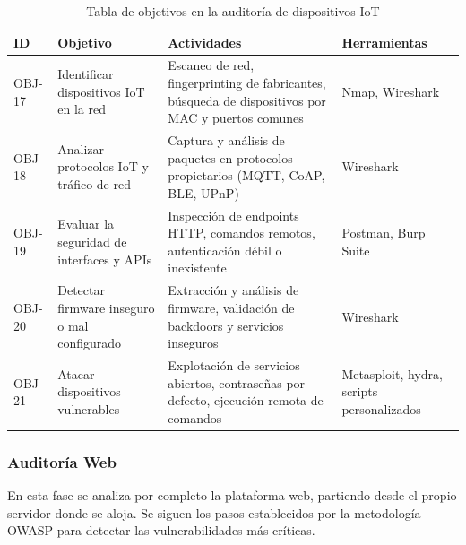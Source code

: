 \documentclass[a4paper, 11pt]{article}
\begin{document}
\begin{table}[H]
\centering
\renewcommand{\arraystretch}{1.4}
    \begin{tabular}{|p{1.4cm}|p{3.9cm}|p{5.3cm}|p{4.2cm}|}
\hline
\textbf{ID} & \textbf{Objetivo} & \textbf{Actividades} & \textbf{Herramientas}  \\
\hline
OBJ-17 & Identificar dispositivos IoT en la red & Escaneo de red, fingerprinting de fabricantes, búsqueda de dispositivos por MAC y puertos comunes & Nmap, Wireshark  \\
\hline
OBJ-18 & Analizar protocolos IoT y tráfico de red & Captura y análisis de paquetes en protocolos propietarios (MQTT, CoAP, BLE, UPnP) & Wireshark  \\
\hline
OBJ-19 & Evaluar la seguridad de interfaces y APIs & Inspección de endpoints HTTP, comandos remotos, autenticación débil o inexistente & Postman, Burp Suite  \\
\hline
OBJ-20 & Detectar firmware inseguro o mal configurado & Extracción y análisis de firmware, validación de backdoors y servicios inseguros & Wireshark  \\
\hline
OBJ-21 & Atacar dispositivos vulnerables & Explotación de servicios abiertos, contraseñas por defecto, ejecución remota de comandos & Metasploit, hydra, scripts personalizados  \\
\hline
\end{tabular}
\caption{Tabla de objetivos en la auditoría de dispositivos IoT}
\end{table}

\par\vspace{0.5cm}


\subsubsection{Auditoría Web}

En esta fase se analiza por completo la plataforma web, partiendo desde el propio servidor donde se aloja. Se siguen los pasos establecidos por la metodología OWASP para detectar las vulnerabilidades más críticas.
\end{document}
